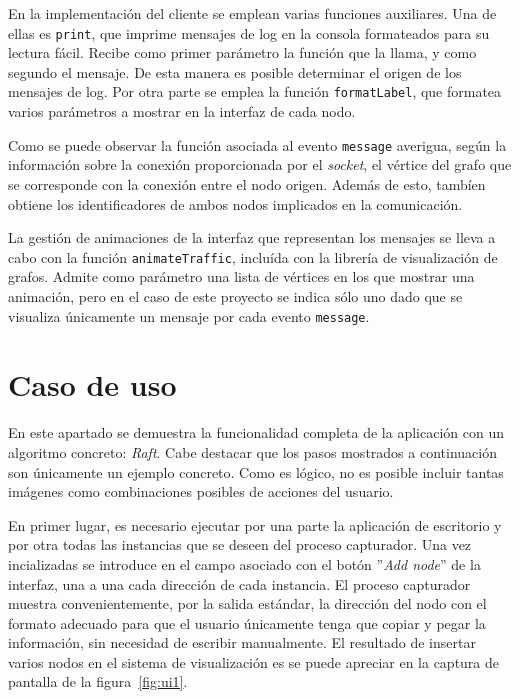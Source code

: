 En la implementación del cliente se emplean varias funciones auxiliares. Una de ellas es \texttt{print}, que imprime mensajes de log en la consola formateados para su lectura fácil. Recibe como primer parámetro la función que la llama, y como segundo el mensaje. De esta manera es posible determinar el origen de los mensajes de log. Por otra parte se emplea la función \texttt{formatLabel}, que formatea varios parámetros a mostrar en la interfaz de cada nodo.

Como se puede observar la función asociada al evento \texttt{message} averigua, según la información sobre la conexión proporcionada por el \textit{socket}, el vértice del grafo que se corresponde con la conexión entre el nodo origen. Además de esto, tambíen obtiene los identificadores de ambos nodos implicados en la comunicación.

La gestión de animaciones de la interfaz que representan los mensajes se lleva a cabo con la función \texttt{animateTraffic}, incluída con la librería de visualización de grafos. Admite como parámetro una lista de vértices en los que mostrar una animación, pero en el caso de este proyecto se indica sólo uno dado que se visualiza únicamente un mensaje por cada evento \texttt{message}.

\section{Caso de uso}

En este apartado se demuestra la funcionalidad completa de la aplicación con un algoritmo concreto: \textit{Raft}. Cabe destacar que los pasos mostrados a continuación son únicamente un ejemplo concreto. Como es lógico, no es posible incluir tantas imágenes como combinaciones posibles de acciones del usuario.

En primer lugar, es necesario ejecutar por una parte la aplicación de escritorio y por otra todas las instancias que se deseen del proceso capturador. Una vez incializadas se introduce en el campo asociado con el botón ''\textit{Add node}'' de la interfaz, una a una cada dirección de cada instancia. El proceso capturador muestra convenientemente, por la salida estándar, la dirección del nodo con el formato adecuado para que el usuario únicamente tenga que copiar y pegar la información, sin necesidad de escribir manualmente. El resultado de insertar varios nodos en el sistema de visualización es se puede apreciar en la captura de pantalla de la figura~\ref{fig:ui1}.


